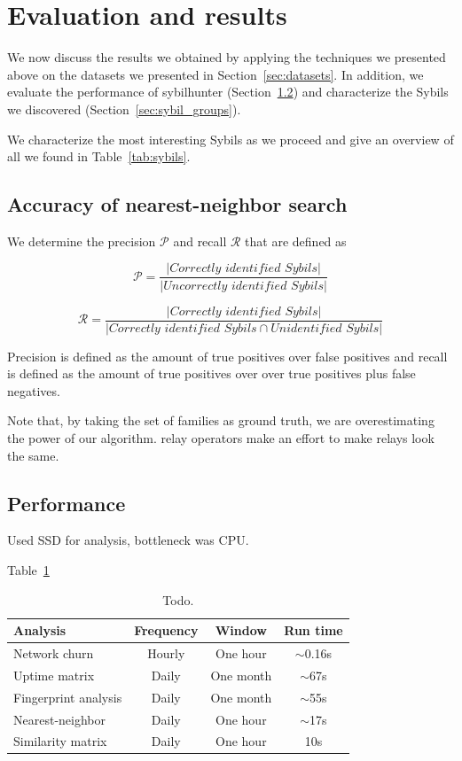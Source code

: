 \section{Evaluation and results}
\label{sec:results}
We now discuss the results we obtained by applying the techniques we presented
above on the datasets we presented in Section~\ref{sec:datasets}.  In addition,
we evaluate the performance of sybilhunter (Section~\ref{sec:performance}) and
characterize the Sybils we discovered (Section~\ref{sec:sybil_groups}).

We characterize the most interesting Sybils as we proceed and give an overview
of all we found in Table~\ref{tab:sybils}.

\subsection{Accuracy of nearest-neighbor search}


We determine the precision $\mathcal{P}$ and recall $\mathcal{R}$ that are
defined as

$$\mathcal{P} = \frac{|\textit{Correctly identified Sybils}|}
{|\textit{Uncorrectly identified Sybils}|}$$

$$\mathcal{R} = \frac{|\textit{Correctly identified Sybils}|}
{|\textit{Correctly identified Sybils} \cap \textit{Unidentified Sybils}|}$$

Precision is defined as the amount of true positives over false positives and
recall is defined as the amount of true positives over over true positives plus
false negatives.

Note that, by taking the set of families as ground truth, we are overestimating
the power of our algorithm.  relay operators make an effort to make relays look
the same.


\subsection{Performance}
\label{sec:performance}

Used SSD for analysis, bottleneck was CPU.

Table~\ref{tab:exp-deployment}
\begin{table}[t]
	\centering
	\begin{tabular}{lccc}
	\textbf{Analysis} & \textbf{Frequency} & \textbf{Window} & \textbf{Run time} \\
	\hline
	Network churn & Hourly & One hour & $\sim$0.16s \\
	Uptime matrix & Daily & One month & $\sim$67s \\
	Fingerprint analysis & Daily & One month & $\sim$55s \\
	Nearest-neighbor & Daily & One hour & $\sim$17s \\
	Similarity matrix & Daily & One hour & 10s \\
	\end{tabular}
	\caption{Todo.}
	\label{tab:exp-deployment}
\end{table}


